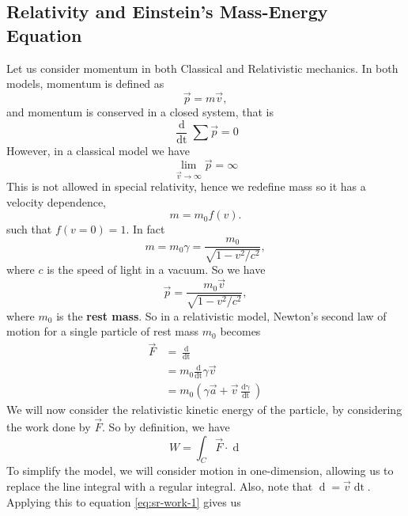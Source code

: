 \subsection{Relativity and Einstein's Mass-Energy Equation}

Let us consider momentum in both Classical and Relativistic mechanics. In both models, momentum is defined as 
\begin{equation}
    \vec{p} = m \vec{v},
\end{equation}
and momentum is conserved in a closed system, that is 
\begin{equation}
    \frac{\mathop{\mathrm{d}}}{\mathop{\mathrm{d}t}} \sum \vec{p} = 0
\end{equation}
However, in a classical model we have
\begin{equation}
    \lim_{\vec{v} \rightarrow \infty} \vec{p} = \infty    
\end{equation} 
This is not allowed in special relativity, hence we redefine mass so it has a velocity dependence, 
\begin{equation}
    m = m_0 f(v).
\end{equation}
such that $f(v = 0) = 1$. In fact
\begin{equation}
    m = m_0 \gamma = \frac{m_0}{\sqrt{1 - v^2 / c^2}},
\end{equation}
where $c$ is the speed of light in a vacuum. So we have
\begin{equation}
    \vec{p} = \frac{m_0 \vec{v}}{\sqrt{1 - v^2 / c^2}},
\end{equation}
where $m_0$ is the \textbf{rest mass}. So in a relativistic model, Newton's second law of motion for a single particle of rest mass $m_0$ becomes
\begin{align}
    \vec{F} &= \frac{\mathop{\mathrm{d}\vec{p}}}{\mathop{\mathrm{d}t}} \\
    &= m_0 \frac{\mathrm{d}}{\mathop{\mathrm{d}t}} \gamma \vec{v} \\
    &= m_0 \left(\gamma \vec{a} + \vec{v} \frac{\mathop{\mathrm{d}\gamma}}{\mathop{\mathrm{d}t}}\right)
\end{align}
We will now consider the relativistic kinetic energy of the particle, by considering the work done by $\vec{F}$. So by definition, we have
\begin{equation}
    W = \int_C \vec{F} \cdot \mathop{\mathrm{d}\vec{r}}
    \label{eq:sr-work-1}
\end{equation}
To simplify the model, we will consider motion in one-dimension, allowing us to replace the line integral with a regular integral. Also, note that $\mathop{\mathrm{d}\vec{r}} = \vec{v} \mathop{\mathrm{d}t}$. Applying this to equation \ref{eq:sr-work-1} gives us
